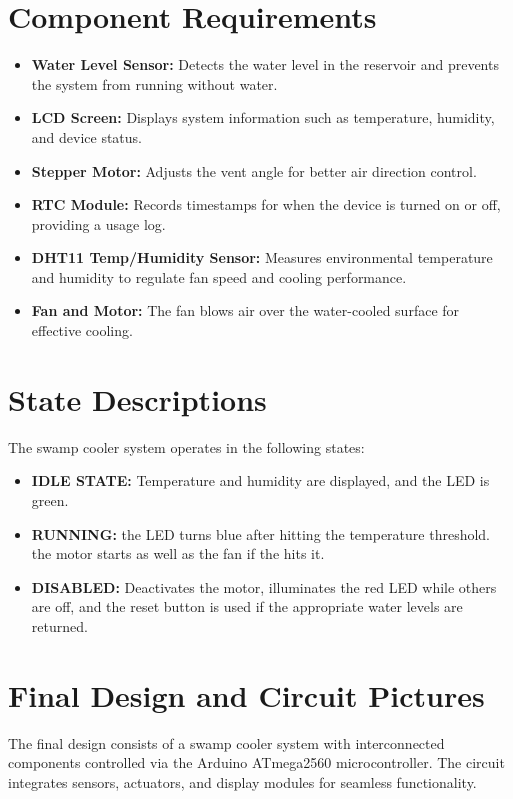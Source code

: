 \documentclass{article}
\begin{document}
\section{Component Requirements}
\begin{itemize}
    \item \textbf{Water Level Sensor:} Detects the water level in the reservoir and prevents the system from running without water.
    \item \textbf{LCD Screen:} Displays system information such as temperature, humidity, and device status.
    \item \textbf{Stepper Motor:} Adjusts the vent angle for better air direction control.
    \item \textbf{RTC Module:} Records timestamps for when the device is turned on or off, providing a usage log.
    \item \textbf{DHT11 Temp/Humidity Sensor:} Measures environmental temperature and humidity to regulate fan speed and cooling performance.
    \item \textbf{Fan and Motor:} The fan blows air over the water-cooled surface for effective cooling.
\end{itemize}

\section{State Descriptions}
The swamp cooler system operates in the following states:
\begin{itemize}
    \item \textbf{IDLE STATE:} Temperature and humidity are displayed, and the LED is green.
    \item \textbf{RUNNING:} the LED turns blue after hitting the temperature threshold. the motor starts as well as the fan if the hits it.
    \item \textbf{DISABLED:} Deactivates the motor, illuminates the red LED while others are off, and the reset button is used if the appropriate water levels are returned. 
\end{itemize}

\section{Final Design and Circuit Pictures}
The final design consists of a swamp cooler system with interconnected components controlled via the Arduino ATmega2560 microcontroller. The circuit integrates sensors, actuators, and display modules for seamless functionality.
\end{document}
